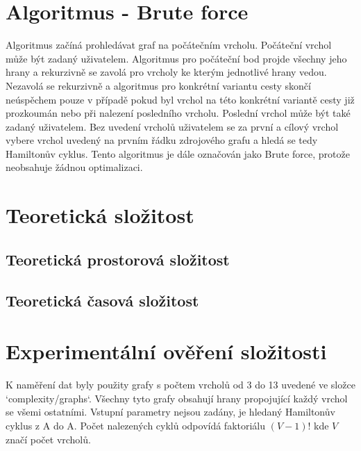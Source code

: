 \documentclass[a4paper,11pt]{article}
\begin{document}
\section{Algoritmus - Brute force}

Algoritmus začíná prohledávat graf na počátečním vrcholu. Počáteční vrchol může být zadaný uživatelem. Algoritmus pro počáteční bod projde všechny jeho hrany a rekurzivně se zavolá pro vrcholy ke kterým jednotlivé hrany vedou. Nezavolá se rekurzivně a algoritmus pro konkrétní variantu cesty skončí neúspěchem pouze v případě pokud byl vrchol na této konkrétní variantě cesty již prozkoumán nebo při nalezení posledního vrcholu. Poslední vrchol může být také zadaný uživatelem. Bez uvedení vrcholů uživatelem se za první a cílový vrchol vybere vrchol uvedený na prvním řádku zdrojového grafu a hledá se tedy Hamiltonův cyklus. Tento algoritmus je dále označován jako Brute force, protože neobsahuje žádnou optimalizaci.

\section{Teoretická složitost}

\subsection{Teoretická prostorová složitost}

\subsection{Teoretická časová složitost}

\section{Experimentální ověření složitosti}

K naměření dat byly použity grafy s počtem vrcholů od 3 do 13 uvedené ve složce `complexity/graphs`. Všechny tyto grafy obsahují hrany propojující každý vrchol se všemi ostatními. Vstupní parametry nejsou zadány, je hledaný Hamiltonův cyklus z A do A. Počet nalezených cyklů odpovídá faktoriálu $(V - 1)!$ kde $V$ značí počet vrcholů.

\end{document}
